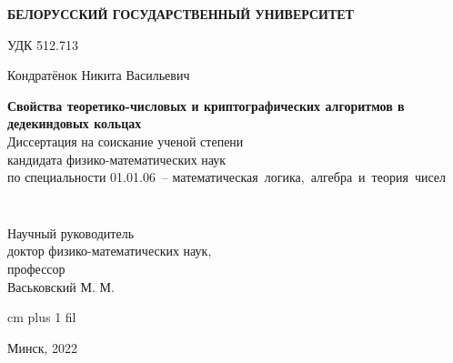 \thispagestyle{empty}
\normalsize
\begin{center}
{\fontsize{16}{16}\selectfont \textbf{БЕЛОРУССКИЙ ГОСУДАРСТВЕННЫЙ УНИВЕРСИТЕТ}}
\end{center}
\vspace{4ex}
\normalsize

\noindent УДК 512.713 %

\normalsize
\begin{center}
\vspace{6ex}
{\fontsize{16}{16}\selectfont Кондратёнок Никита Васильевич}
\end{center}
\vspace{0ex}
\begin{center}
\large
\textbf{Свойства теоретико-числовых и криптографических алгоритмов в дедекиндовых кольцах}\\
\vspace{4ex}
{\fontsize{15}{15}\selectfont Диссертация на соискание ученой степени}\\
{\fontsize{15}{15}\selectfont кандидата физико-математических наук}\\
\vspace{2ex}
{\fontsize{15}{15}\selectfont по специальности 01.01.06~-- математическая~логика,~алгебра~и~теория~чисел}
\vspace{2ex}
\end{center}


\normalsize
\vspace{3ex}
\begin{minipage}{0.4\textwidth}
  \begin{flushleft}
$\,$\\
$\,$\\
$\,$\\
$\,$\\
\end{flushleft}
\end{minipage}
$\quad$
\begin{minipage}{0.5\textwidth}
  \begin{flushleft}
Научный руководитель\\
доктор физико-математических наук,\\
профессор\\
Васьковский М. М.\\
  \end{flushleft}
\end{minipage}


 cm plus 1 fil
\begin{center}
Минск, 2022
\end{center}
\eject
